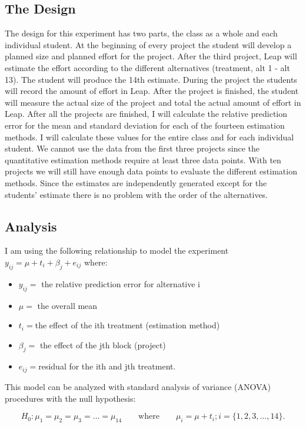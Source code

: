 \subsection{The Design}

The design for this experiment has two parts, the class as a whole and each
individual student.  At the beginning of every project the student will develop
a planned size and planned effort for the project.  After the third project,
Leap will estimate the effort according to the different alternatives
(treatment, alt 1 - alt 13). The student will produce the 14th estimate.
During the project the students will record the amount of effort in Leap.
After the project is finished, the student will measure the actual size of the
project and total the actual amount of effort in Leap.  After all the projects
are finished, I will calculate the relative prediction error for the mean and
standard deviation for each of the fourteen estimation methods.  I will
calculate these values for the entire class and for each individual student.
We cannot use the data from the first three projects since the quantitative
estimation methods require at least three data points.  With ten projects we
will still have enough data points to evaluate the different estimation
methods.  Since the estimates are independently generated except for the
students' estimate there is no problem with the order of the alternatives.

\subsection{Analysis}
I am using the following relationship to model the experiment $y_{ij} = \mu + t_i + \beta_j
+ e_{ij}$ where: \begin{itemize}
\item $y_{ij} =$ the relative prediction error for alternative i
\item $\mu =$ the overall mean
\item $t_i = $the effect of  the ith treatment (estimation method)
\item $\beta_j =$ the effect of the jth block (project)
\item $e_{ij} = $residual for the ith and jth treatment.
\end{itemize}

This model can be analyzed with standard analysis of variance (ANOVA)
procedures with the null hypothesis:  

       \[H_0:  \mu_1 = \mu_2 = \mu_3 = \ldots = \mu_{14} \qquad\mbox{where}\qquad \mu_i = \mu + t_i; i = \{1, 2,3, \ldots , 14\}.\]
      
